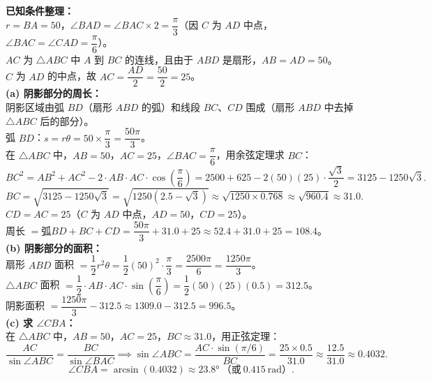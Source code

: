 \documentclass[12pt,a4paper]{ctexart}
\newenvironment{solution}
  {%
    \par\noindent
  }
  {\par}
\begin{document}
\begin{solution}
    \textbf{已知条件整理：} \\
    $r = BA = 50$，$\angle BAD = \angle BAC \times 2 = \dfrac{\pi}{3}$（因 $C$ 为 $AD$ 中点，$\angle BAC = \angle CAD = \dfrac{\pi}{6}$）。\\
    $AC$ 为 $\triangle ABC$ 中 $A$ 到 $BC$ 的连线，且由于 $ABD$ 是扇形，$AB = AD = 50$。\\
    $C$ 为 $AD$ 的中点，故 $AC = \dfrac{AD}{2} = \dfrac{50}{2} = 25$。\\

    \textbf{(a) 阴影部分的周长：} \\
    阴影区域由弧 $BD$（扇形 $ABD$ 的弧）和线段 $BC$、$CD$ 围成（扇形 $ABD$ 中去掉 $\triangle ABC$ 后的部分）。\\
    弧 $BD$：$s = r\theta = 50 \times \dfrac{\pi}{3} = \dfrac{50\pi}{3}$。\\
    在 $\triangle ABC$ 中，$AB = 50$，$AC = 25$，$\angle BAC = \dfrac{\pi}{6}$，用余弦定理求 $BC$：
    \[
        BC^2 = AB^2 + AC^2 - 2\cdot AB \cdot AC \cdot\cos\!\left(\frac{\pi}{6}\right)
        = 2500 + 625 - 2(50)(25)\!\cdot\!\frac{\sqrt{3}}{2}
        = 3125 - 1250\sqrt{3}.
    \]
    \[
        BC = \sqrt{3125 - 1250\sqrt{3}} = \sqrt{1250(2.5 - \sqrt{3})} \approx \sqrt{1250\times0.768} \approx \sqrt{960.4} \approx 31.0.
    \]
    $CD = AC = 25$（$C$ 为 $AD$ 中点，$AD=50$，$CD=25$）。\\
    周长 $= \text{弧}BD + BC + CD = \dfrac{50\pi}{3} + 31.0 + 25 \approx 52.4 + 31.0 + 25 = 108.4$。\\

    \textbf{(b) 阴影部分的面积：} \\
    扇形 $ABD$ 面积 $= \dfrac{1}{2}r^2\theta = \dfrac{1}{2}(50)^2\!\cdot\!\dfrac{\pi}{3} = \dfrac{2500\pi}{6} = \dfrac{1250\pi}{3}$。\\
    $\triangle ABC$ 面积 $= \dfrac{1}{2}\cdot AB\cdot AC\cdot\sin\!\left(\dfrac{\pi}{6}\right) = \dfrac{1}{2}(50)(25)(0.5) = 312.5$。\\
    阴影面积 $= \dfrac{1250\pi}{3} - 312.5 \approx 1309.0 - 312.5 = 996.5$。\\

    \textbf{(c) 求 $\angle CBA$：} \\
    在 $\triangle ABC$ 中，$AB=50$，$AC=25$，$BC\approx 31.0$，用正弦定理：
    \[
        \frac{AC}{\sin\angle ABC} = \frac{BC}{\sin\angle BAC}
        \implies \sin\angle ABC = \frac{AC\cdot\sin(\pi/6)}{BC} = \frac{25\times0.5}{31.0} \approx \frac{12.5}{31.0} \approx 0.4032.
    \]
    \[
        \angle CBA = \arcsin(0.4032) \approx 23.8°\ \text{（或}\ 0.415\ \text{rad）}.
    \]
\end{solution}
\end{document}
